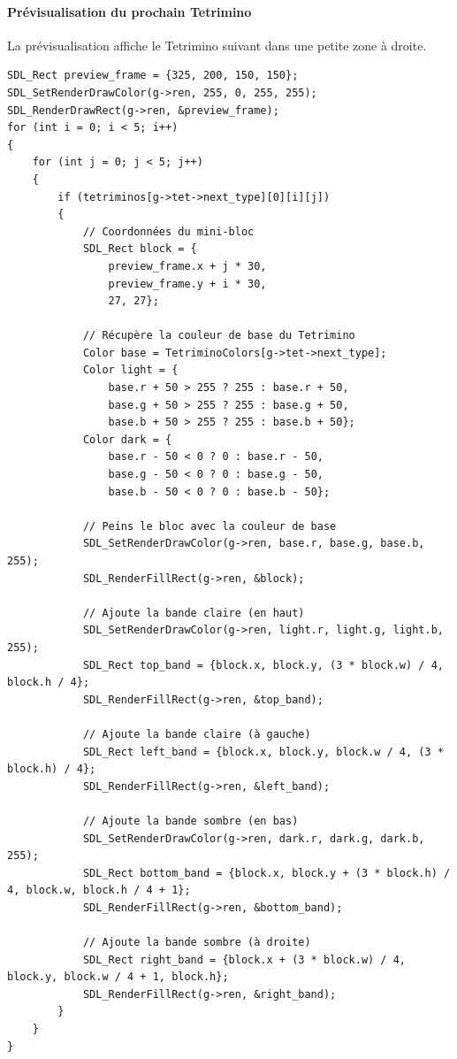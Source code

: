 \documentclass[12pt,a4paper]{report}
\begin{document}
\paragraph{Prévisualisation du prochain Tetrimino}
La prévisualisation affiche le Tetrimino suivant dans une petite zone à droite.

\begin{lstlisting}
SDL_Rect preview_frame = {325, 200, 150, 150};
SDL_SetRenderDrawColor(g->ren, 255, 0, 255, 255);
SDL_RenderDrawRect(g->ren, &preview_frame);
for (int i = 0; i < 5; i++)
{
    for (int j = 0; j < 5; j++)
    {
        if (tetriminos[g->tet->next_type][0][i][j])
        {
            // Coordonnées du mini-bloc
            SDL_Rect block = {
                preview_frame.x + j * 30,
                preview_frame.y + i * 30,
                27, 27};

            // Récupère la couleur de base du Tetrimino
            Color base = TetriminoColors[g->tet->next_type];
            Color light = {
                base.r + 50 > 255 ? 255 : base.r + 50,
                base.g + 50 > 255 ? 255 : base.g + 50,
                base.b + 50 > 255 ? 255 : base.b + 50};
            Color dark = {
                base.r - 50 < 0 ? 0 : base.r - 50,
                base.g - 50 < 0 ? 0 : base.g - 50,
                base.b - 50 < 0 ? 0 : base.b - 50};

            // Peins le bloc avec la couleur de base
            SDL_SetRenderDrawColor(g->ren, base.r, base.g, base.b, 255);
            SDL_RenderFillRect(g->ren, &block);

            // Ajoute la bande claire (en haut)
            SDL_SetRenderDrawColor(g->ren, light.r, light.g, light.b, 255);
            SDL_Rect top_band = {block.x, block.y, (3 * block.w) / 4, block.h / 4};
            SDL_RenderFillRect(g->ren, &top_band);

            // Ajoute la bande claire (à gauche)
            SDL_Rect left_band = {block.x, block.y, block.w / 4, (3 * block.h) / 4};
            SDL_RenderFillRect(g->ren, &left_band);

            // Ajoute la bande sombre (en bas)
            SDL_SetRenderDrawColor(g->ren, dark.r, dark.g, dark.b, 255);
            SDL_Rect bottom_band = {block.x, block.y + (3 * block.h) / 4, block.w, block.h / 4 + 1};
            SDL_RenderFillRect(g->ren, &bottom_band);

            // Ajoute la bande sombre (à droite)
            SDL_Rect right_band = {block.x + (3 * block.w) / 4, block.y, block.w / 4 + 1, block.h};
            SDL_RenderFillRect(g->ren, &right_band);
        }
    }
}
\end{lstlisting}
\newpage
\end{document}
